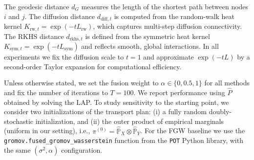 \documentclass{article}
\begin{document}
The geodesic distance $d_G$ measures the length of the shortest path between nodes $i$ and $j$. The diffusion distance $d_{\mathrm{diff},t}$ is computed from the random-walk heat kernel $K_{\mathrm{rw},t} = \exp(-tL_{\mathrm{rw}})$, which captures multi-step diffusion connectivity. The RKHS distance $d_{\mathrm{rkhs},t}$ is defined from the symmetric heat kernel $K_{\mathrm{sym},t} = \exp(-tL_{\mathrm{sym}})$ and reflects smooth, global interactions. In all experiments we fix the diffusion scale to $t=1$ and approximate $\exp(-tL)$ by a second-order Taylor expansion for computational efficiency.

Unless otherwise stated, we set the fusion weight to $\alpha \in \{0, 0.5, 1\}$ for all methods and fix the number of iterations to $T = 100$. We report performance using $\hat{P}$ obtained by solving the LAP. To study sensitivity to the starting point, we consider two initializations of the transport plan:
(i) a fully random doubly-stochastic initialization, and
(ii) the outer product of empirical marginals (uniform in our setting), i.e., $\pi^{(0)} = \hat{\mathbb{P}}_X \otimes \hat{\mathbb{P}}_Y$. For the FGW baseline we use the \texttt{gromov.fused\_gromov\_wasserstein} function from the \texttt{POT} Python library, with the same $(\sigma^2, \alpha)$ configuration.
\end{document}
